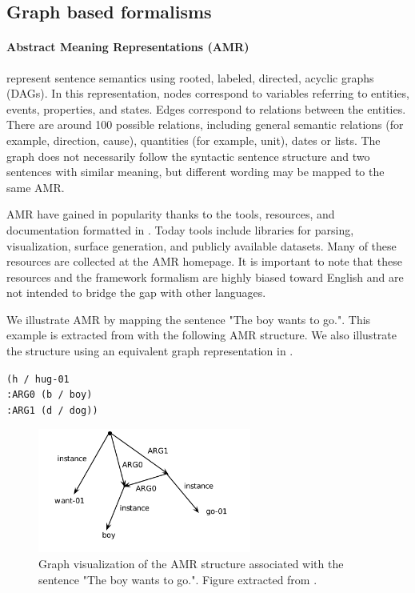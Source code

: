 \subsection{Graph based formalisms} 


\paragraph{Abstract Meaning Representations (AMR)} represent sentence semantics using rooted, labeled, directed, acyclic graphs (DAGs). In this representation, nodes correspond to variables referring to entities, events, properties, and states. Edges correspond to relations between the entities. There are around 100 possible relations, including general semantic relations (for example, direction, cause), quantities (for example, unit), dates or lists. The graph does not necessarily follow the syntactic sentence structure and two sentences with similar meaning, but different wording may be mapped to the same AMR. 

AMR have gained in popularity thanks to the tools, resources, and documentation formatted in \textcite{banarescu2013abstract}. Today tools include libraries for parsing, visualization, surface generation, and publicly available datasets. Many of these resources are collected at the AMR homepage. It is important to note that these resources and the framework formalism are highly biased toward English and are not intended to bridge the gap with other languages.

We illustrate AMR by mapping the sentence "The boy wants to go.". This example is extracted from \textcite{banarescu2013abstract} with the following AMR structure. We also illustrate the structure using an equivalent graph representation in .

\begin{center}
\texttt{(h\,/\,hug-01
    \\ \T :ARG0\,(b\,/\,boy)
    \\ \T :ARG1\,(d\,/\,dog))}    
\end{center}


\begin{figure}[!htb]
\begin{center}
\includegraphics[width=7cm]{images/amr-boy.png}
\end{center}
\caption{Graph visualization of the AMR structure associated with the sentence "The boy wants to go.". Figure extracted from \textcite{banarescu2013abstract}.}
\end{figure}

